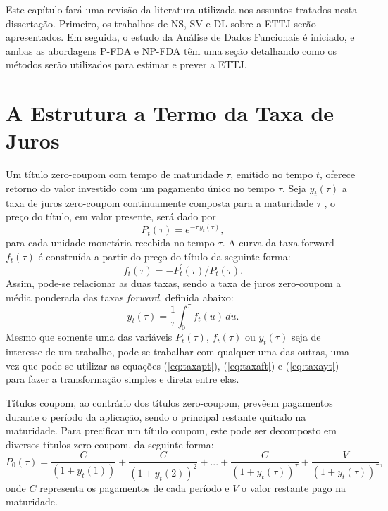 \documentclass[
	12pt,				%
	openright,			%
	oneside,			%
	a4paper,			%
	english,			%
	brazil				%
	]{dissertacao-ufrgs-abntex2}
\begin{document}
Este capítulo fará uma revisão da literatura utilizada nos assuntos tratados nesta dissertação. Primeiro, os trabalhos de NS, SV e DL sobre a ETTJ serão apresentados. Em seguida, o estudo da Análise de Dados Funcionais é iniciado, e ambas as abordagens P-FDA e NP-FDA têm uma seção detalhando como os métodos serão utilizados para estimar e prever a ETTJ. 

\section{A Estrutura a Termo da Taxa de Juros}

Um título zero-coupom com tempo de maturidade $\tau$, emitido no tempo $t$, oferece retorno do valor investido com um pagamento único no tempo $\tau$. Seja $y_{t}(\tau)$ a taxa de juros zero-coupom continuamente composta para a maturidade $\tau$ , o preço do título, em valor presente, será dado por
\begin{equation}
P_{t}(\tau)=e^{-\tau\, y_{t}(\tau)},\label{eq:taxapt}
\end{equation}
para cada unidade monetária recebida no tempo $\tau$. A curva da
taxa forward $f_{t}(\tau)$ é construída a partir do preço do título
da seguinte forma:
\begin{equation}
f_{t}(\tau)=-P_{t}^{\prime}(\tau)/P_{t}(\tau).\label{eq:taxaft}
\end{equation}
Assim, pode-se relacionar as duas taxas, sendo a taxa de juros zero-coupom
a média ponderada das taxas \emph{forward}, definida abaixo:
\begin{equation}
y_{t}(\tau)=\frac{1}{\tau}\int_{0}^{\tau}f_{t}(u)\, du.\label{eq:taxayt}
\end{equation}
Mesmo que somente uma das variáveis $P_{t}(\tau)$,\foreignlanguage{english}{ $f_{t}(\tau)$} ou $y_{t}(\tau)$ seja de interesse de um trabalho, pode-se trabalhar com qualquer uma das outras, uma vez que pode-se utilizar as equações (\ref{eq:taxapt}), (\ref{eq:taxaft}) e (\ref{eq:taxayt}) para fazer a transformação simples e direta entre elas. 

Títulos coupom, ao contrário dos títulos zero-coupom, prevêem pagamentos durante o período da aplicação, sendo o principal restante quitado na maturidade. Para precificar um título coupom, este pode ser decomposto em diversos títulos zero-coupom, da seguinte forma:
\[
P_{0}(\tau)=\frac{C}{(1+y_{t}(1))}+\frac{C}{(1+y_{t}(2))^{2}}+...+\frac{C}{(1+y_{t}(\tau))^{\tau}}+\frac{V}{(1+y_{t}(\tau))^{\tau}},
\]
onde $C$ representa os pagamentos de cada período e $V$ o valor
restante pago na maturidade.
\end{document}
